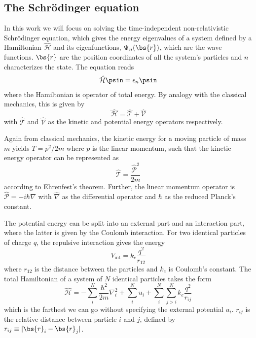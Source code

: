 \subsection{The Schrödinger equation} \label{subsec:schrodinger}
In this work we will focus on solving the time-independent non-relativistic Schrödinger equation, which gives the energy eigenvalues of a system defined by a Hamiltonian $\hat{\mathcal{H}}$ and its eigenfunctions, $\Psi_n(\bs{r})$, which are the wave functions. $\bs{r}$ are the position coordinates of all the system's particles and $n$ characterizes the state. The equation reads
\begin{equation}
\label{eq:Energy}
 \hat{\mathcal{H}}\psin=\epsilon_n\psin
\end{equation}
where the Hamiltonian is operator of total energy. By analogy with the classical mechanics, this is given by
\begin{equation}
\hat{\mathcal{H}}=\hat{\mathcal{T}}+\hat{\mathcal{V}}
\end{equation}
with $\hat{\mathcal{T}}$ and $\hat{\mathcal{V}}$ as the kinetic and potential energy operators respectively. 

Again from classical mechanics, the kinetic energy for a moving particle of mass $m$ yields $T=p^2/2m$ where $p$ is the linear momentum, such that the kinetic energy operator can be represented as 
\begin{equation}
\hat{\mathcal{T}}=\frac{\hat{\mathcal{P}}^2}{2m}
\end{equation}
according to Ehrenfest's theorem. Further, the linear momentum operator is $\hat{\mathcal{P}}=-i\hbar\hat{\nabla}$ with $\hat{\nabla}$ as the differential operator and $\hbar$ as the reduced Planck's constant.

The potential energy can be split into an external part and an interaction part, where the latter is given by the Coulomb interaction. For two identical particles of charge $q$, the repulsive interaction gives the energy
\begin{equation}
V_{\text{int}} =k_e\frac{q^2}{r_{12}}
\end{equation}
where $r_{12}$ is the distance between the particles and $k_e$ is Coulomb's constant. The total Hamiltonian of a system of $N$ identical particles takes the form
\begin{equation}
\hat{\mathcal{H}}=-\sum_i^N\frac{\hbar^2}{2m}\nabla_i^2+\sum_i^{N}u_i + \sum_i^N\sum_{j>i}^Nk_e\frac{q^2}{r_{ij}}
\label{eq:ElectronicHamiltonian}
\end{equation}
which is the farthest we can go without specifying the external potential $u_i$. $r_{ij}$ is the relative distance between particle $i$ and $j$, defined by $r_{ij}\equiv|\bs{r}_i-\bs{r}_j|$.

